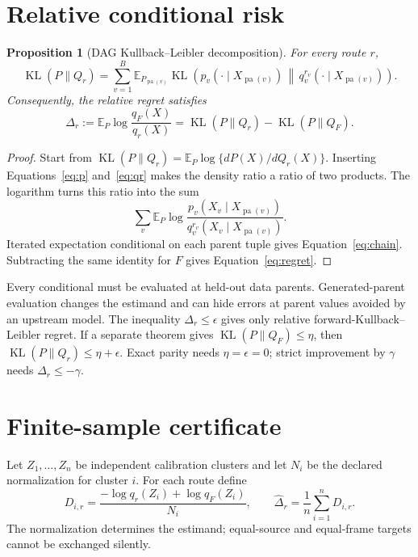 \documentclass[11pt]{article}
\newtheorem{proposition}{Proposition}[section]
\DeclareMathOperator{\KL}{KL}
\newcommand{\E}{\mathbb E}
\begin{document}
\section{Relative conditional risk}

\begin{proposition}[DAG Kullback--Leibler decomposition]
For every route $r$,
\begin{equation}
 \KL(P\|Q_r)=\sum_{v=1}^{B}\E_{P_{\operatorname{pa}(v)}}
 \KL\!\left(p_v(\cdot\mid X_{\operatorname{pa}(v)})\,
 \middle\|\,q_v^{r_v}(\cdot\mid X_{\operatorname{pa}(v)})\right).
 \label{eq:chain}
\end{equation}
Consequently, the relative regret satisfies
\begin{equation}
 \Delta_r:=\E_P\log\frac{q_F(X)}{q_r(X)}
 =\KL(P\|Q_r)-\KL(P\|Q_F).
 \label{eq:regret}
\end{equation}
\end{proposition}

\begin{proof}
Start from $\KL(P\|Q_r)=\E_P\log\{dP(X)/dQ_r(X)\}$.  Inserting Equations~\eqref{eq:p} and~\eqref{eq:qr} makes the density ratio a ratio of two products.  The logarithm turns this ratio into the sum
\[
 \sum_v\E_P\log\frac{p_v(X_v\mid X_{\operatorname{pa}(v)})}
 {q_v^{r_v}(X_v\mid X_{\operatorname{pa}(v)})}.
\]
Iterated expectation conditional on each parent tuple gives Equation~\eqref{eq:chain}.  Subtracting the same identity for $F$ gives Equation~\eqref{eq:regret}.
\end{proof}

Every conditional must be evaluated at held-out data parents.  Generated-parent evaluation changes the estimand and can hide errors at parent values avoided by an upstream model.  The inequality $\Delta_r\le\epsilon$ gives only relative forward-Kullback--Leibler regret.  If a separate theorem gives $\KL(P\|Q_F)\le\eta$, then $\KL(P\|Q_r)\le\eta+\epsilon$.  Exact parity needs $\eta=\epsilon=0$; strict improvement by $\gamma$ needs $\Delta_r\le-\gamma$.

\section{Finite-sample certificate}

Let $Z_1,\ldots,Z_n$ be independent calibration clusters and let $N_i$ be the declared normalization for cluster $i$.  For each route define
\begin{equation}
 D_{i,r}=\frac{-\log q_r(Z_i)+\log q_F(Z_i)}{N_i},
 \qquad
 \widehat\Delta_r=\frac{1}{n}\sum_{i=1}^{n}D_{i,r}.
 \label{eq:paired}
\end{equation}
The normalization determines the estimand; equal-source and equal-frame targets cannot be exchanged silently.
\end{document}

